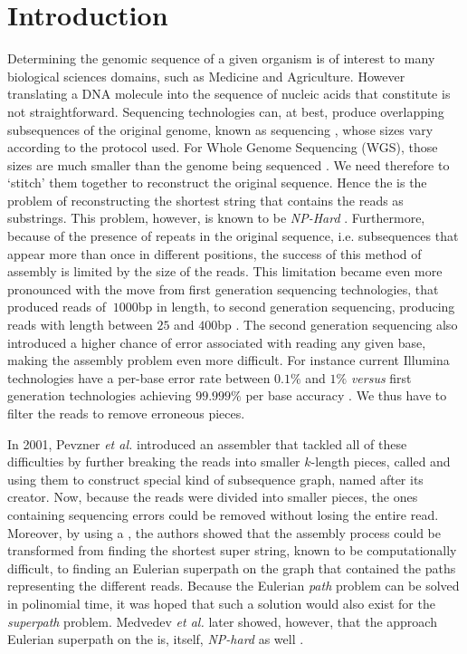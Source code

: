 \chapter{Introduction}

Determining the genomic sequence of a given organism is of interest to many biological sciences domains, such as Medicine and Agriculture.  However translating a DNA molecule into the sequence of nucleic acids that constitute is not straightforward. Sequencing technologies can, at best, produce overlapping subsequences of the original genome, known as sequencing , whose sizes vary according to the protocol used. For Whole Genome Sequencing (WGS), those sizes are much smaller than the genome being sequenced \cite{Miller2010}. We need therefore to `stitch' them together to reconstruct the original sequence. Hence the  is the problem of reconstructing the shortest string that contains the reads as substrings. This problem, however, is known to be \emph{NP-Hard} \cite{Gallant1980}. Furthermore, because of the presence of repeats in the original sequence, i.e. subsequences that appear more than once in different positions, the success of this method of assembly is limited by the size of the reads. This limitation became even more pronounced with the move from first generation sequencing technologies, that produced reads of $~1000$bp in length, to second generation sequencing, producing reads with length between $25$ and $400$bp \cite{Shendure2008}. The second generation sequencing also introduced a higher chance of error associated with reading any given base, making the assembly problem even more difficult. For instance current Illumina technologies have a per-base error rate between $0.1\%$ and $1\%$ \cite{Metzker2010} \emph{versus} first generation technologies achieving $99.999\%$ per base accuracy \cite{Shendure2008}. We thus have to filter the reads to remove erroneous pieces.

In 2001, Pevzner \emph{et al.} \cite{Pevzner2001} introduced an assembler that tackled all of these difficulties by further breaking the reads into smaller $k$-length pieces, called  and using them to construct special kind of subsequence graph, named \keyterm{\dBG} after its creator. Now, because the reads were divided into smaller pieces, the ones containing sequencing errors could be removed without losing the entire read. Moreover, by using a \dBG, the authors showed that the assembly process could be transformed from finding the shortest super string, known to be computationally difficult, to finding an Eulerian superpath on the graph that contained the paths representing the different reads. Because the Eulerian \emph{path} problem can be solved in polinomial time, it was hoped that such a solution would also exist for the \emph{superpath} problem. Medvedev \emph{et al.} later showed, however, that the approach Eulerian superpath on the \dBG is, itself, \emph{NP-hard} as well \cite{Medvedev2007}.

